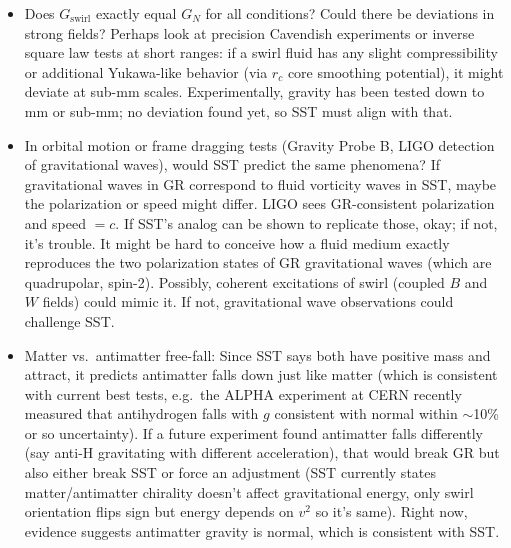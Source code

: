 \documentclass[10pt,reprint,aps,onecolumn,nofootinbib]{revtex4-2}
\newcommand{\rc}{r_c}                                    %
\providecommand{\rc}{r_c}
\begin{document}
\begin{itemize}
  \item Does $G_{\text{swirl}}$ exactly equal $G_N$ for all conditions? Could there be deviations in strong fields? Perhaps look at precision Cavendish experiments or inverse square law tests at short ranges: if a swirl fluid has any slight compressibility or additional Yukawa-like behavior (via $\rc$ core smoothing potential), it might deviate at sub-mm scales. Experimentally, gravity has been tested down to mm or sub-mm; no deviation found yet, so SST must align with that.

  \item In orbital motion or frame dragging tests (Gravity Probe B, LIGO detection of gravitational waves), would SST predict the same phenomena? If gravitational waves in GR correspond to fluid vorticity waves in SST, maybe the polarization or speed might differ. LIGO sees GR-consistent polarization and speed $=c$. If SST's analog can be shown to replicate those, okay; if not, it's trouble. It might be hard to conceive how a fluid medium exactly reproduces the two polarization states of GR gravitational waves (which are quadrupolar, spin-2). Possibly, coherent excitations of swirl (coupled $B$ and $W$ fields) could mimic it. If not, gravitational wave observations could challenge SST.

  \item Matter vs.\ antimatter free-fall: Since SST says both have positive mass and attract, it predicts antimatter falls down just like matter (which is consistent with current best tests, e.g.\ the ALPHA experiment at CERN recently measured that antihydrogen falls with $g$ consistent with normal within $\sim$10\% or so uncertainty). If a future experiment found antimatter falls differently (say anti-H gravitating with different acceleration), that would break GR but also either break SST or force an adjustment (SST currently states matter/antimatter chirality doesn't affect gravitational energy, only swirl orientation flips sign but energy depends on $v^2$ so it's same). Right now, evidence suggests antimatter gravity is normal, which is consistent with SST.


\end{itemize}
\end{document}
